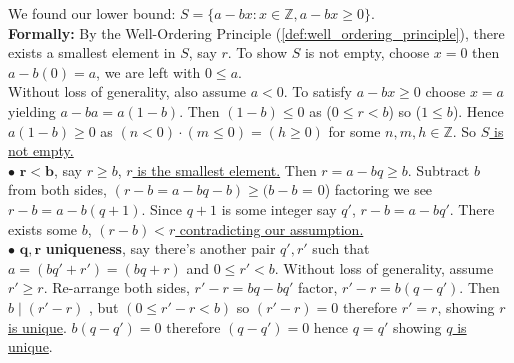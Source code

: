 \begin{Proof} 
    \noindent
    We found our lower bound: \Large{$S=\{a-bx:x\in\mathbb{Z}, a-bx\geq0\}$.}\\

    \normalsize
    \noindent
    \textbf{Formally:} By the Well-Ordering Principle (\ref{def:well_ordering_principle}), there exists a smallest element in $S$, say $r$.
    To show $S$ is not empty, choose $x=0$ then $a-b(0)=a$, we are left with $0\leq a$.\\

    \noindent
    Without loss of generality, also assume $a<0$. To satisfy $a-bx\geq0$ choose $x=a$ yielding
    $a-ba=a(1-b)$. Then $(1-b)\leq0$ as ($0\leq r <b$) so ($1\leq b$). Hence
    $a(1-b)\geq0$ as $(n<0)\cdot (m\leq0)=(h\geq0)$ for some $n,m,h\in\mathbb{Z}$. So \underline{$S$ is not empty.}\\

    \noindent
    $\bullet$ $\mathbf{r<b}$, say $r\geq b$, \underline{$r$ is the smallest element.} Then $r=a-bq\geq b$. Subtract $b$ from both sides,
    $(r-b=a-bq-b)\geq (b-b$ = 0) factoring we see $r-b=a-b(q+1)$. Since
    $q+1$ is some integer say $q'$, $r-b=a-bq'$. There exists some $b$, \underline{$(r-b)<r$ contradicting our assumption.}\\

        \noindent
    $\bullet$ $\mathbf{q,r}$ \textbf{uniqueness}, say there's another pair $q',r'$ such that
    $a=(bq'+r')=(bq+r)$ and $0\leq r'<b$. Without loss of generality, assume $r'\geq r$.
        Re-arrange both sides, $r'-r=bq-bq'$ factor, $r'-r=b(q-q')$. Then $b\mid (r'-r)$
        , but $(0\leq r'-r<b)$ so $(r'-r)=0$ therefore $r'=r$, showing \underline{$r$ is unique}.
    $b(q-q')=0$ therefore $(q-q')=0$ hence $q=q'$ showing \underline{$q$ is unique}.
\end{Proof}

\newpage
